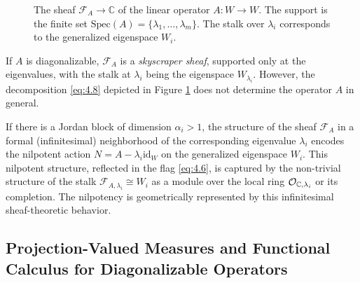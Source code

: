 \begin{figure}[h!]
    \caption{The sheaf $\mathcal{F}_A \to \mathbb{C}$ of the linear operator $A: W \to W$. The support is the finite set $\text{Spec}(A) = \{\lambda_1, \dots, \lambda_m\}$. The stalk over $\lambda_i$ corresponds to the generalized eigenspace $W_i$.}
    \label{fig:figure5}
    \end{figure}
\begin{remark}
If $A$ is diagonalizable, $\mathcal{F}_A$ is a \textit{skyscraper sheaf}, supported only at the eigenvalues, with the stalk at $\lambda_i$ being the eigenspace $W_{\lambda_i}$. However, the decomposition \eqref{eq:4.8} depicted in Figure \ref{fig:figure5} does not determine the operator $A$ in general.

If there is a Jordan block of dimension $\alpha_i > 1$, the structure of the sheaf $\mathcal{F}_A$ in a formal (infinitesimal) neighborhood of the corresponding eigenvalue $\lambda_i$ encodes the nilpotent action $N = A - \lambda_i \text{id}_W$ on the generalized eigenspace $W_i$. This nilpotent structure, reflected in the flag \eqref{eq:4.6}, is captured by the non-trivial structure of the stalk $\mathcal{F}_{A,\lambda_i} \cong W_i$ as a module over the local ring $\mathcal{O}_{\mathbb{C}, \lambda_i}$ or its completion. The nilpotency is geometrically represented by this infinitesimal sheaf-theoretic behavior.
\end{remark}
\subsection{Projection-Valued Measures and Functional Calculus for Diagonalizable Operators}
\label{sec:pvm}

